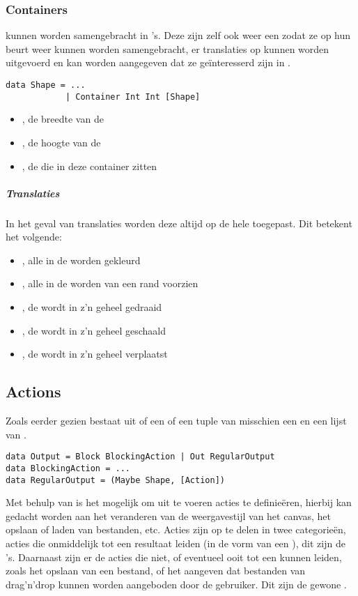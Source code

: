 \subsubsection{Containers}
\shapes kunnen worden samengebracht in 's. Deze zijn zelf ook weer een \shape zodat ze op hun beurt weer kunnen worden samengebracht, er translaties op kunnen worden uitgevoerd en kan worden aangegeven dat ze geïnteresserd zijn in \events. 
\begin{lstlisting}
data Shape = ...
			| Container Int Int [Shape]
\end{lstlisting}
\begin{itemize}
	\item {}, de breedte van de 
	\item {}, de hoogte van de 
	\item \type{[Shape]}, de \shapes die in deze container zitten
\end{itemize}

\subparagraph{Translaties}
In het geval van translaties worden deze altijd op de hele  toegepast. Dit betekent het volgende:
\begin{itemize}
	\item {}, alle \shapes in de  worden gekleurd
	\item {}, alle \shapes in de  worden van een rand voorzien
	\item {}, de  wordt in z'n geheel gedraaid
	\item {}, de  wordt in z'n geheel geschaald
	\item {}, de  wordt in z'n geheel verplaatst
\end{itemize}

\subsection{Actions}
Zoals eerder gezien bestaat  uit of een  of een tuple van misschien een \shape en een lijst van \actions. 
\begin{lstlisting}
data Output = Block BlockingAction | Out RegularOutput
data BlockingAction = ... 
data RegularOutput = (Maybe Shape, [Action])
\end{lstlisting}

Met behulp van \actions is het mogelijk om uit te voeren acties te definieëren, hierbij kan gedacht worden aan het veranderen van de weergavestijl van het canvas, het opslaan of laden van bestanden, etc.
Acties zijn op te delen in twee categorieën, acties die onmiddelijk tot een resultaat leiden (in de vorm van een ), dit zijn de 's. Daarnaast zijn er de acties die niet, of eventueel ooit tot een  kunnen leiden, zoals het opslaan van een bestand, of het aangeven dat bestanden van drag'n'drop kunnen worden aangeboden door de gebruiker. Dit zijn de gewone \actions.

